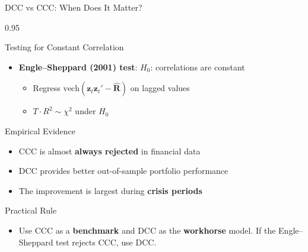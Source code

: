 \documentclass[9pt, aspectratio=169, t]{beamer}
\begin{document}
\begin{frame}{DCC vs CCC: When Does It Matter?}
    \begin{cminipage}{0.95\textwidth}
    {\footnotesize
    \begin{block}{Testing for Constant Correlation}
        \begin{itemize}\setlength{\itemsep}{0pt}
            \item \textbf{Engle--Sheppard (2001) test}: $H_0$: correlations are constant
                \begin{itemize}\setlength{\itemsep}{0pt}
                    \item Regress $\text{vech}(\mathbf{z}_t\mathbf{z}_t' - \hat{\mathbf{R}})$ on lagged values
                    \item $T \cdot R^2 \sim \chi^2$ under $H_0$
                \end{itemize}
        \end{itemize}
    \end{block}
    \vspace{0.1cm}
    \begin{block}{Empirical Evidence}
        \begin{itemize}\setlength{\itemsep}{0pt}
            \item CCC is almost \textbf{always rejected} in financial data
            \item DCC provides better out-of-sample portfolio performance
            \item The improvement is largest during \textbf{crisis periods}
        \end{itemize}
    \end{block}
    \vspace{0.1cm}
    \begin{alertblock}{Practical Rule}
        \begin{itemize}\setlength{\itemsep}{0pt}
            \item Use CCC as a \textbf{benchmark} and DCC as the \textbf{workhorse} model. If the Engle--Sheppard test rejects CCC, use DCC.
        \end{itemize}
    \end{alertblock}
    }
    \end{cminipage}
\end{frame}
\end{document}
